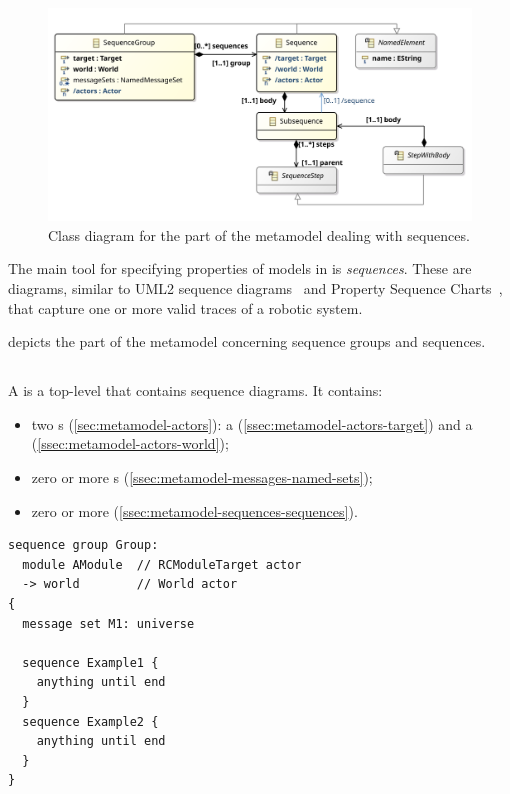\begin{figure}[htb]
	\centering
	\includegraphics[width=\textwidth]{diagrams/Sequences}
	\caption{Class diagram for the part of the \langname{} metamodel dealing with sequences.}
	\label{fig:metamodel-sequences}
\end{figure}

The main tool for specifying properties of \robochart{} models in
\langname{} is \emph{sequences}.  These are diagrams, similar to UML2
sequence diagrams~\cite{lima-semantics} and Property Sequence Charts~\cite{psc},
that capture one or more valid traces of a robotic system.

 depicts the part of the metamodel concerning
sequence groups and sequences.

\subsection{\msequencegroup}

A \msequencegroup{} is a top-level \mnamedelement{} that contains sequence diagrams.
It contains:

\begin{itemize}
\item
  two \mactor s (\cref{sec:metamodel-actors}):
  a \mtarget{} (\cref{ssec:metamodel-actors-target})
  and a \mworld{} (\cref{ssec:metamodel-actors-world});
\item
  zero or more \mnamedmessageset{}s (\cref{ssec:metamodel-messages-named-sets});
\item
  zero or more \msequence{} (\cref{ssec:metamodel-sequences-sequences}).
\end{itemize}

\begin{lstlisting}[style=Example]
sequence group Group:
  module AModule  // RCModuleTarget actor
  -> world        // World actor
{
  message set M1: universe
  
  sequence Example1 {
    anything until end
  }
  sequence Example2 {
    anything until end
  }
}
\end{lstlisting}

